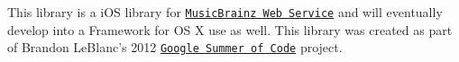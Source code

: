 This library is a i\-O\-S library for \href{http://musicbrainz.org/doc/XML_Web_Service/Version_2}{\tt Music\-Brainz Web Service} and will eventually develop into a Framework for O\-S X use as well. This library was created as part of Brandon Le\-Blanc's 2012 \href{https://google-melange.appspot.com/gsoc/proposal/review/google/gsoc2012/demosdemon/1}{\tt Google Summer of Code} project. 